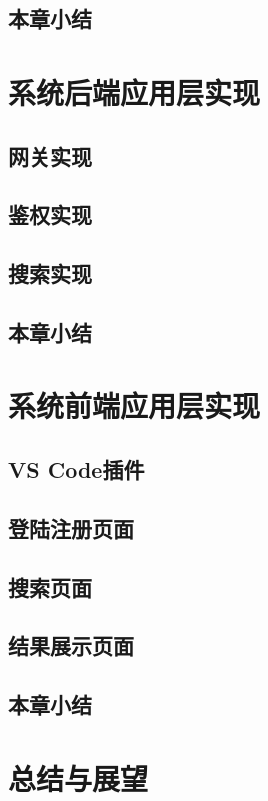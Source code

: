 \documentclass[UTF8,a4paper,12pt]{ctexart}
\numberwithin{equation}{section}
\begin{document}
\subsection{本章小结}
\section{系统后端应用层实现}
\subsection{网关实现}
\subsection{鉴权实现}
\subsection{搜索实现}
\subsection{本章小结}
\section{系统前端应用层实现}
\subsection{VS Code插件}
\subsection{登陆注册页面}
\subsection{搜索页面}
\subsection{结果展示页面}
\subsection{本章小结}
\section{总结与展望}
\end{document}
